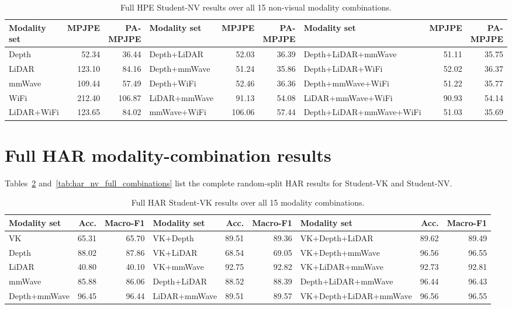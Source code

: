 \documentclass[preprint,12pt]{elsarticle}
\newcommand{\mpjpe}{MPJPE}
\newcommand{\pampjpe}{PA-MPJPE}
\begin{document}
\begin{table}[h]
\centering
\caption{Full HPE Student-NV results over all 15 non-visual modality combinations.}
\label{tab:hpe_nv_full_combinations}
\scriptsize
\begin{adjustbox}{width=\textwidth}
\begin{tabular}{lrr|lrr|lrr}
\toprule
Modality set & \mpjpe{} & \pampjpe{} & Modality set & \mpjpe{} & \pampjpe{} & Modality set & \mpjpe{} & \pampjpe{} \\
\midrule
Depth & 52.34 & 36.44 & Depth+LiDAR & 52.03 & 36.39 & Depth+LiDAR+mmWave & 51.11 & 35.75 \\
LiDAR & 123.10 & 84.16 & Depth+mmWave & 51.24 & 35.86 & Depth+LiDAR+WiFi & 52.02 & 36.37 \\
mmWave & 109.44 & 57.49 & Depth+WiFi & 52.46 & 36.36 & Depth+mmWave+WiFi & 51.22 & 35.77 \\
WiFi & 212.40 & 106.87 & LiDAR+mmWave & 91.13 & 54.08 & LiDAR+mmWave+WiFi & 90.93 & 54.14 \\
LiDAR+WiFi & 123.65 & 84.02 & mmWave+WiFi & 106.06 & 57.44 & Depth+LiDAR+mmWave+WiFi & 51.03 & 35.69 \\
\bottomrule
\end{tabular}
\end{adjustbox}
\end{table}

\section{Full HAR modality-combination results}

Tables~\ref{tab:har_vk_full_combinations} and~\ref{tab:har_nv_full_combinations} list the complete random-split HAR results for Student-VK and Student-NV.

\begin{table}[h]
\centering
\caption{Full HAR Student-VK results over all 15 modality combinations.}
\label{tab:har_vk_full_combinations}
\scriptsize
\begin{adjustbox}{width=\textwidth}
\begin{tabular}{lrr|lrr|lrr}
\toprule
Modality set & Acc. & Macro-F1 & Modality set & Acc. & Macro-F1 & Modality set & Acc. & Macro-F1 \\
\midrule
VK & 65.31 & 65.70 & VK+Depth & 89.51 & 89.36 & VK+Depth+LiDAR & 89.62 & 89.49 \\
Depth & 88.02 & 87.86 & VK+LiDAR & 68.54 & 69.05 & VK+Depth+mmWave & 96.56 & 96.55 \\
LiDAR & 40.80 & 40.10 & VK+mmWave & 92.75 & 92.82 & VK+LiDAR+mmWave & 92.73 & 92.81 \\
mmWave & 85.88 & 86.06 & Depth+LiDAR & 88.52 & 88.39 & Depth+LiDAR+mmWave & 96.44 & 96.43 \\
Depth+mmWave & 96.45 & 96.44 & LiDAR+mmWave & 89.51 & 89.57 & VK+Depth+LiDAR+mmWave & 96.56 & 96.55 \\
\bottomrule
\end{tabular}
\end{adjustbox}
\end{table}
\end{document}
